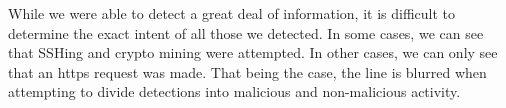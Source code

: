 While we were able to detect a great deal of information, it is difficult to determine the exact intent of all those we detected. In some cases, we can see that SSHing  and crypto mining were attempted. In other cases, we can only see that an https request was made. That being the case, the line is blurred when attempting to divide detections into malicious and non-malicious activity.